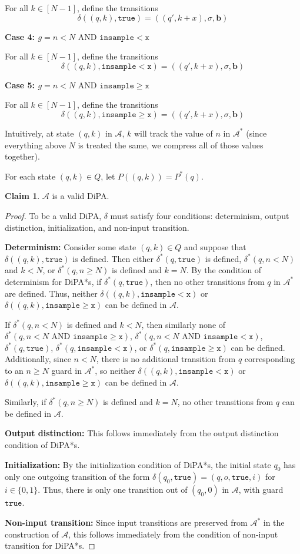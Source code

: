 \documentclass[12pt]{article}
\newcommand{\gguard}{\texttt{insample}\geq \texttt{x}}
\newcommand{\lguard}{\texttt{insample} < \texttt{x}}
\newcommand{\gaguard}{n<N \text{ AND } \texttt{insample} \geq \texttt{x}}
\newcommand{\laguard}{n<N\text{ AND }\texttt{insample} < \texttt{x}}
\theoremstyle{definition}
\newtheorem{clm}[thm]{Claim}
\begin{document}
For all $k \in [N-1]$, define the transitions
\[
	\delta((q, k), \texttt{true}) = ((q', k+x), \sigma, \mathbf{b})	
\]

\textbf{Case 4: $g = \laguard $}

For all $k \in [N-1]$, define the transitions
\[
	\delta((q, k), \lguard) = ((q', k+x), \sigma, \mathbf{b})	
\]

\textbf{Case 5: $g = \gaguard $}

For all $k \in [N-1]$, define the transitions
\[
	\delta((q, k), \gguard) = ((q', k+x), \sigma, \mathbf{b})	
\]

Intuitively, at state $(q, k)$ in $\mathcal{A}$, $k$ will track the value of $n$ in $\mathcal{A}^*$ (since everything above $N$ is treated the same, we compress all of those values together).

For each state $(q, k)\in Q$, let $P((q, k)) = P^*(q)$.

\begin{clm}
	$\mathcal{A}$ is a valid DiPA.\@
\end{clm}
\begin{proof}
	To be a valid DiPA, $\delta$ must satisfy four conditions: determinism, output distinction, initialization, and non-input transition. 

	\textbf{Determinism:} Consider some state $(q, k)\in Q$ and suppose that $\delta((q, k), \texttt{true})$ is defined. Then either $\delta^*(q, \texttt{true})$ is defined, $\delta^*(q, n <N)$ and $k < N$, or $\delta^*(q, n\geq N)$ is defined and $k = N$. By the condition of determinism for DiPA*s, if $\delta^*(q, \texttt{true})$, then no other transitions from $q$ in $\mathcal{A}^*$ are defined. Thus, neither $\delta((q, k), \lguard)$ or $\delta((q, k), \gguard)$ can be defined in $\mathcal{A}$.

	If $\delta^*(q, n < N)$ is defined and $k < N$, then similarly none of $\delta^*(q, \gaguard)$, $\delta^*(q, \laguard)$, $\delta^*(q, \texttt{true})$, $\delta^*(q, \lguard)$, or $\delta^*(q, \gguard)$ can be defined. Additionally, since $ n < N$, there is no additional transition from $q$ corresponding to an $n\geq N$ guard in $\mathcal{A}^*$, so neither $\delta((q, k), \lguard)$ or $\delta((q, k), \gguard)$ can be defined in $\mathcal{A}$.

	Similarly, if $\delta^*(q, n \geq N)$ is defined and $k = N$, no other transitions from $q$ can be defined in $\mathcal{A}$.

	\textbf{Output distinction:} This follows immediately from the output distinction condition of DiPA*s.

	\textbf{Initialization:} By the initialization condition of DiPA*s, the initial state $q_0$ has only one outgoing transition of the form $\delta(q_0, \texttt{true}) = (q, o, \texttt{true}, i)$ for $i\in \{0, 1\}$. Thus, there is only one transition out of $(q_0, 0)$ in $\mathcal{A}$, with guard $\texttt{true}$.

	\textbf{Non-input transition:} Since input transitions are preserved from $\mathcal{A}^*$ in the construction of $\mathcal{A}$, this follows immediately from the condition of non-input transition for DiPA*s.
\end{proof}
\end{document}
